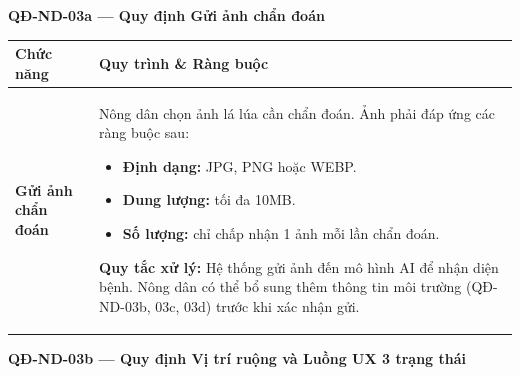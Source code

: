 \documentclass[12pt,a4paper]{article}
\begin{document}
\vspace{0.3cm}
\noindent\textbf{QĐ-ND-03a --- Quy định Gửi ảnh chẩn đoán}

\begin{longtable}{|
        >{\raggedright\arraybackslash}p{2.8cm}|
        >{\raggedright\arraybackslash}p{12cm}|}
    \hline
    \rowcolor{headerblue}
    \textbf{Chức năng}         & \textbf{Quy trình \& Ràng buộc}                                                                                                               \\
    \hline
    \endhead
    \textbf{Gửi ảnh chẩn đoán} &
    Nông dân chọn ảnh lá lúa cần chẩn đoán. Ảnh phải đáp ứng các ràng buộc sau:
    \begin{itemize}[leftmargin=*,topsep=2pt,itemsep=1pt]
        \item \textbf{Định dạng:} JPG, PNG hoặc WEBP.
        \item \textbf{Dung lượng:} tối đa 10MB.
        \item \textbf{Số lượng:} chỉ chấp nhận 1 ảnh mỗi lần chẩn đoán.
    \end{itemize}
    \textbf{Quy tắc xử lý:} Hệ thống gửi ảnh đến mô hình AI để nhận diện bệnh. Nông dân có thể bổ sung thêm thông tin môi trường (QĐ-ND-03b, 03c, 03d) trước khi xác nhận gửi. \\
    \hline
\end{longtable}

\vspace{0.3cm}
\noindent\textbf{QĐ-ND-03b --- Quy định Vị trí ruộng và Luồng UX 3 trạng thái}
\end{document}
